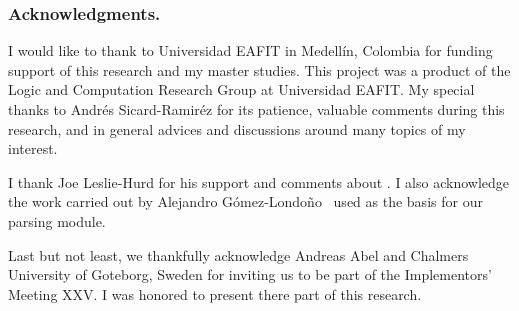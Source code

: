 \documentclass[../main.tex]{subfiles}
\begin{document}

\subsubsection*{Acknowledgments.}

I would like to thank to Universidad EAFIT in Medell\'in, Colombia for funding
support of this research and my master studies.
This project was a product of the Logic and Computation
Research Group at Universidad EAFIT.
My special thanks to Andrés Sicard-Ramiréz for its patience, valuable comments
during this research, and in general advices and discussions around many
topics of my interest.

I thank Joe Leslie-Hurd for his support and comments about \Metis.
I also acknowledge the work carried out by Alejandro
G\'omez-Londo\~no~\cite{Gomez-Londono2015} used as the basis
for our \TSTP parsing module.

Last but not least, we thankfully acknowledge
Andreas Abel and Chalmers University of Goteborg, Sweden for
inviting us to be part of the \Agda Implementors’ Meeting XXV.
I was honored to present there part of this research.
\end{document}
